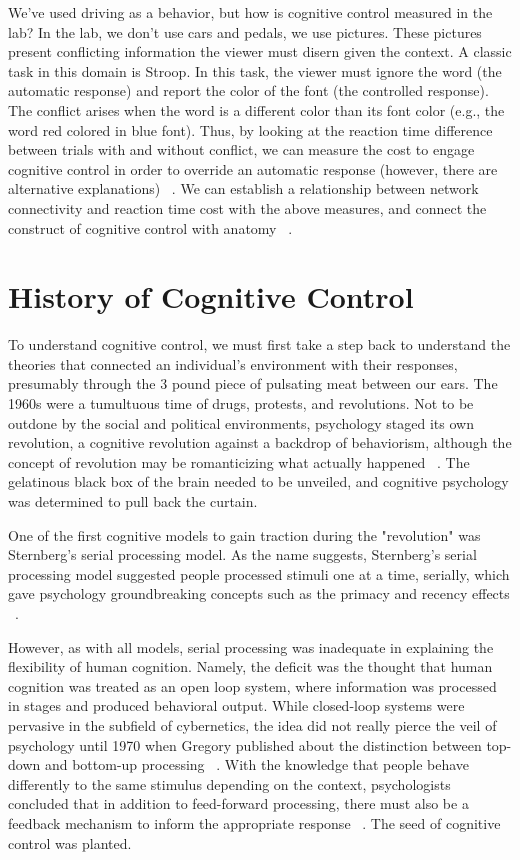 \documentclass[phd,appendix,figures]{uithesis}
\begin{document}
We've used driving as a behavior, but how is cognitive control measured in the lab?
In the lab, we don't use cars and pedals, we use pictures.
These pictures present conflicting information the viewer must disern given the context.
A classic task in this domain is Stroop.
In this task, the viewer must ignore the word (the automatic response) and report the color of the font (the controlled response).
The conflict arises when the word is a different color than its font color (e.g., the word red colored in blue font).
Thus, by looking at the reaction time difference between trials with  and without conflict, we can measure the cost to engage cognitive control in order to override an automatic response (however, there are alternative explanations) ~\citep{Hommel2011}. 
We can establish a relationship between network connectivity and reaction time cost with the above measures, and connect the construct of cognitive control with anatomy ~\citep{Braver2008,Dosenbach2007}.

\section{History of Cognitive Control}

To understand cognitive control, we must first take a step back to understand the theories that connected an individual's environment with their responses, presumably through the 3 pound piece of pulsating meat between our ears.
The 1960s were a tumultuous time of drugs, protests, and revolutions. 
Not to be outdone by the social and political environments, psychology staged its own revolution, a cognitive revolution against a backdrop of behaviorism, although the concept of revolution may be romanticizing what actually happened ~\citep{Leahey1992}. 
The gelatinous black box of the brain needed to be unveiled, and cognitive psychology was determined to pull back the curtain. 

One of the first cognitive models to gain traction during the "revolution" was Sternberg's serial processing model.
As the name suggests, Sternberg's serial processing model suggested people processed stimuli one at a time, serially, which gave psychology groundbreaking concepts such as the primacy and recency effects ~\citep{Sternberg1966}.

However, as with all models, serial processing was inadequate in explaining the flexibility of human cognition.
Namely, the deficit was the thought that human cognition was treated as an open loop system, where information was processed in stages and produced behavioral output. 
While closed-loop systems were pervasive in the subfield of cybernetics, the idea did not really pierce the veil of psychology until 1970 when Gregory published about the distinction between top-down and bottom-up processing ~\citep{Gregory1970}.
With the knowledge that people behave differently to the same stimulus depending on the context, psychologists concluded that in addition to feed-forward processing, there must also be a feedback mechanism to inform the appropriate response ~\citep{Gregory1970}.
The seed of cognitive control was planted.
\end{document}
